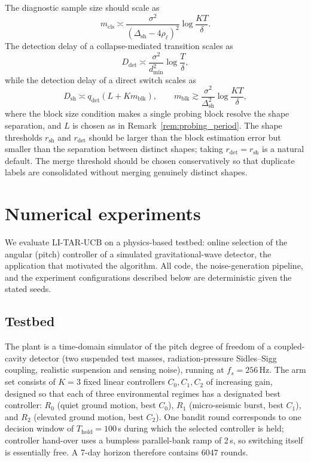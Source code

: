 \documentclass[11pt]{article}
\begin{document}
The diagnostic sample size should scale as
\begin{equation}
\label{eq:practical_m_cls}
m_{\mathrm{cls}}
\asymp
\frac{\sigma^2}{(\Delta_{\mathrm{sh}}-4\rho_{\ell})^2}
\log\frac{KT}{\delta}.
\end{equation}
The detection delay of a collapse-mediated transition scales as
\begin{equation}
\label{eq:practical_d_det}
D_{\mathrm{det}}
\asymp
\frac{\sigma^2}{d_{\min}^2}
\log\frac{T}{\delta},
\end{equation}
while the detection delay of a direct switch scales as
\begin{equation}
\label{eq:practical_d_sh}
D_{\mathrm{sh}}
\asymp
q_{\mathrm{det}}\left(L+Km_{\mathrm{blk}}\right),
\qquad
m_{\mathrm{blk}}
\gtrsim
\frac{\sigma^2}{\Delta_{\mathrm{sh}}^2}\log\frac{KT}{\delta},
\end{equation}
where the block size condition makes a single probing block resolve the shape separation, and $L$ is chosen as in Remark~\ref{rem:probing_period}. The shape thresholds $r_{\mathrm{sh}}$ and $r_{\mathrm{det}}$ should be larger than the block estimation error but smaller than the separation between distinct shapes; taking $r_{\mathrm{det}}=r_{\mathrm{sh}}$ is a natural default. The merge threshold should be chosen conservatively so that duplicate labels are consolidated without merging genuinely distinct shapes.

\section{Numerical experiments}
\label{sec:experiments}

We evaluate LI-TAR-UCB on a physics-based testbed: online selection of the angular (pitch) controller of a simulated gravitational-wave detector, the application that motivated the algorithm. All code, the noise-generation pipeline, and the experiment configurations described below are deterministic given the stated seeds.

\subsection{Testbed}
\label{subsec:testbed}

The plant is a time-domain simulator of the pitch degree of freedom of a coupled-cavity detector (two suspended test masses, radiation-pressure Sidles--Sigg coupling, realistic suspension and sensing noise), running at $f_s=256$\,Hz. The arm set consists of $K=3$ fixed linear controllers $C_0,C_1,C_2$ of increasing gain, designed so that each of three environmental regimes has a designated best controller: $R_0$ (quiet ground motion, best $C_0$), $R_1$ (micro-seismic burst, best $C_1$), and $R_2$ (elevated ground motion, best $C_2$). One bandit round corresponds to one decision window of $T_{\mathrm{hold}}=100$\,s during which the selected controller is held; controller hand-over uses a bumpless parallel-bank ramp of 2\,s, so switching itself is essentially free. A 7-day horizon therefore contains $6047$ rounds.
\end{document}
